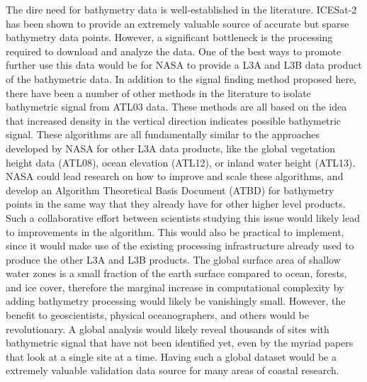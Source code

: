 The dire need for bathymetry data is well-established in the literature. ICESat-2 has been shown to provide an extremely valuable source of accurate but sparse bathymetry data points. However, a significant bottleneck is the processing required to download and analyze the data. One of the best ways to promote further use this data would be for NASA to provide a L3A and L3B data product of the bathymetric data. 
In addition to the signal finding method proposed here, there have been a number of other methods in the literature to isolate bathymetric signal from ATL03 data. These methods are all based on the idea that increased density in the vertical direction indicates possible bathymetric signal. These algorithms are all fundamentally similar to the approaches developed by NASA for other L3A data products, like the global vegetation height data (ATL08), ocean elevation (ATL12), or inland water height (ATL13). NASA could lead research on how to improve and scale these algorithms, and develop an Algorithm Theoretical Basis Document (ATBD) for bathymetry points in the same way that they already have for other higher level products. Such a collaborative effort between scientists studying this issue would likely lead to improvements in the algorithm. This would also be practical to implement, since it would make use of the existing processing infrastructure already used to produce the other L3A and L3B products. The global surface area of shallow water zones is a small fraction of the earth surface compared to ocean, forests, and ice cover, therefore the marginal increase in computational complexity by adding bathymetry processing would likely be vanishingly small. However, the benefit to geoscientists, physical oceanographers, and others would be revolutionary. A global analysis would likely reveal thousands of sites with bathymetric signal that have not been identified yet, even by the myriad papers that look at a single site at a time. Having such a global dataset would be a extremely valuable validation data source for many areas of coastal research. 